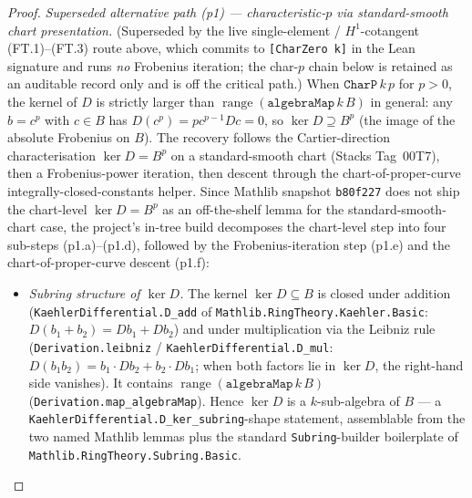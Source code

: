 \begin{proof}
  \emph{Superseded alternative path (p1) --- characteristic-\(p\) via standard-smooth chart presentation.} (Superseded by the live single-element / \(H^1\)-cotangent (FT.1)--(FT.3) route above, which commits to \texttt{[CharZero k]} in the Lean signature and runs \emph{no} Frobenius iteration; the char-\(p\) chain below is retained as an auditable record only and is off the critical path.) When \(\mathtt{CharP}\,k\,p\) for \(p > 0\), the kernel of \(D\) is strictly larger than \(\operatorname{range}(\mathtt{algebraMap}\,k\,B)\) in general: any \(b = c^p\) with \(c \in B\) has \(D(c^p) = p c^{p-1} D c = 0\), so \(\ker D \supseteq B^p\) (the image of the absolute Frobenius on \(B\)). The recovery follows the Cartier-direction characterisation \(\ker D = B^p\) on a standard-smooth chart (Stacks Tag~00T7), then a Frobenius-power iteration, then descent through the chart-of-proper-curve integrally-closed-constants helper. Since Mathlib snapshot \texttt{b80f227} does not ship the chart-level \(\ker D = B^p\) as an off-the-shelf lemma for the standard-smooth-chart case, the project's in-tree build decomposes the chart-level step into four sub-steps (p1.a)--(p1.d), followed by the Frobenius-iteration step (p1.e) and the chart-of-proper-curve descent (p1.f):
  \begin{itemize}
    \item[(p1.a)] \emph{Subring structure of \(\ker D\).} The kernel \(\ker D \subseteq B\) is closed under addition (\texttt{KaehlerDifferential.D\_add} of \texttt{Mathlib.RingTheory.Kaehler.Basic}: \(D(b_1 + b_2) = D b_1 + D b_2\)) and under multiplication via the Leibniz rule (\texttt{Derivation.leibniz} / \texttt{KaehlerDifferential.D\_mul}: \(D(b_1 b_2) = b_1 \cdot D b_2 + b_2 \cdot D b_1\); when both factors lie in \(\ker D\), the right-hand side vanishes). It contains \(\operatorname{range}(\mathtt{algebraMap}\,k\,B)\) (\texttt{Derivation.map\_algebraMap}). Hence \(\ker D\) is a \(k\)-sub-algebra of \(B\) --- a \texttt{KaehlerDifferential.D\_ker\_subring}-shape statement, assemblable from the two named Mathlib lemmas plus the standard \texttt{Subring}-builder boilerplate of \texttt{Mathlib.RingTheory.Subring.Basic}.

\end{itemize}
\end{proof}
